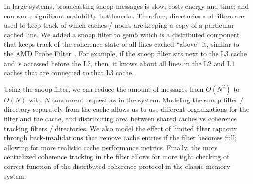 In large systems, broadcasting snoop messages is slow; costs energy and time; and can cause significant scalability bottlenecks.
Therefore, directories and filters are used to keep track of which caches / nodes are keeping a copy of a particular cached line.
We added a snoop filter to gem5 which is a distributed component that keeps track of the coherence state of all lines cached ``above'' it, similar to the AMD Probe Filter~\cite{Conway:opteron:2010}.
For example, if the snoop filter sits next to the L3 cache and is accessed before the L3, then, it knows about all lines in the L2 and L1 caches that are connected to that L3 cache.

Using the snoop filter, we can reduce the amount of messages from $O(N^2)$ to $O(N)$ with $N$ concurrent requestors in the system.
Modeling the snoop filter / directory separately from the cache allows us to use different organizations for the filter and the cache, and distributing area between shared caches vs coherence tracking filters / directories.
We also model the effect of limited filter capacity through back-invalidations that remove cache entries if the filter becomes full; allowing for more realistic cache performance metrics.
Finally, the more centralized coherence tracking in the filter allows for more tight checking of correct function of the distributed coherence protocol in the classic memory system.
